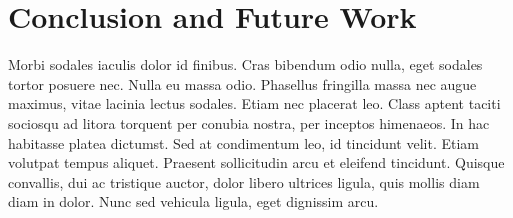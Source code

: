 \documentclass[sigconf]{acmart}
\begin{document}
\section{Conclusion and Future Work}

Morbi sodales iaculis dolor id finibus. Cras bibendum odio nulla, eget sodales tortor posuere nec. Nulla eu massa odio. Phasellus fringilla massa nec augue maximus, vitae lacinia lectus sodales. Etiam nec placerat leo. Class aptent taciti sociosqu ad litora torquent per conubia nostra, per inceptos himenaeos. In hac habitasse platea dictumst. Sed at condimentum leo, id tincidunt velit. Etiam volutpat tempus aliquet. Praesent sollicitudin arcu et eleifend tincidunt. Quisque convallis, dui ac tristique auctor, dolor libero ultrices ligula, quis mollis diam diam in dolor. Nunc sed vehicula ligula, eget dignissim arcu.


 
\end{document}
